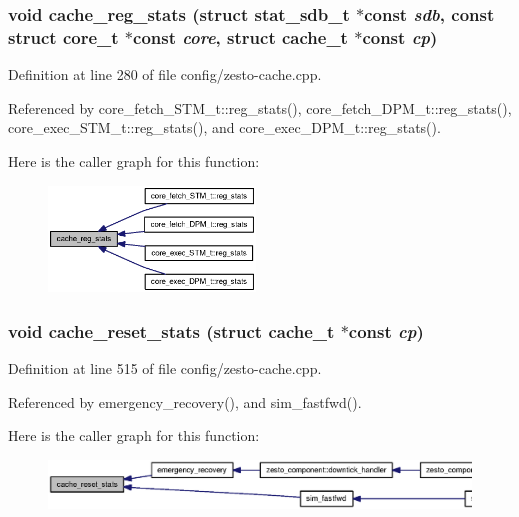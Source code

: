 \subsubsection[{cache\_\-reg\_\-stats}]{\setlength{\rightskip}{0pt plus 5cm}void cache\_\-reg\_\-stats (struct {\bf stat\_\-sdb\_\-t} $\ast$const  {\em sdb}, \/  const struct {\bf core\_\-t} $\ast$const  {\em core}, \/  struct {\bf cache\_\-t} $\ast$const  {\em cp})}\label{config_2zesto-cache_8cpp_80141f1bc8f06e0805162cdd6936c5d8}




Definition at line 280 of file config/zesto-cache.cpp.

Referenced by core\_\-fetch\_\-STM\_\-t::reg\_\-stats(), core\_\-fetch\_\-DPM\_\-t::reg\_\-stats(), core\_\-exec\_\-STM\_\-t::reg\_\-stats(), and core\_\-exec\_\-DPM\_\-t::reg\_\-stats().

Here is the caller graph for this function:\nopagebreak
\begin{figure}[H]
\begin{center}
\leavevmode
\includegraphics[width=156pt]{config_2zesto-cache_8cpp_80141f1bc8f06e0805162cdd6936c5d8_icgraph}
\end{center}
\end{figure}
\subsubsection[{cache\_\-reset\_\-stats}]{\setlength{\rightskip}{0pt plus 5cm}void cache\_\-reset\_\-stats (struct {\bf cache\_\-t} $\ast$const  {\em cp})}\label{config_2zesto-cache_8cpp_aff01697c94f19565dfd6d631bf4bf76}




Definition at line 515 of file config/zesto-cache.cpp.

Referenced by emergency\_\-recovery(), and sim\_\-fastfwd().

Here is the caller graph for this function:\nopagebreak
\begin{figure}[H]
\begin{center}
\leavevmode
\includegraphics[width=391pt]{config_2zesto-cache_8cpp_aff01697c94f19565dfd6d631bf4bf76_icgraph}
\end{center}
\end{figure}
